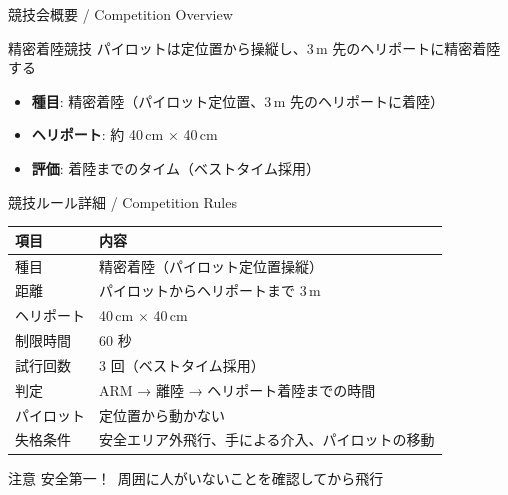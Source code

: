 \documentclass[aspectratio=169, 14pt]{beamer}
\begin{document}
\begin{frame}
  \titlepage
\end{frame}

\begin{frame}{競技会概要 / Competition Overview}
  \begin{block}{精密着陸競技}
    パイロットは定位置から操縦し、3\,m 先のヘリポートに精密着陸する
  \end{block}

  \vspace{1em}

  \begin{itemize}
    \item \textbf{種目}: 精密着陸（パイロット定位置、3\,m 先のヘリポートに着陸）
    \item \textbf{ヘリポート}: 約 40\,cm $\times$ 40\,cm
    \item \textbf{評価}: 着陸までのタイム（ベストタイム採用）
  \end{itemize}
\end{frame}

\begin{frame}{競技ルール詳細 / Competition Rules}
  \centering
  \begin{tabular}{ll}
    \hline
    \textbf{項目} & \textbf{内容} \\
    \hline
    種目      & 精密着陸（パイロット定位置操縦） \\
    距離      & パイロットからヘリポートまで 3\,m \\
    ヘリポート & 40\,cm $\times$ 40\,cm \\
    制限時間  & 60 秒 \\
    試行回数  & 3 回（ベストタイム採用） \\
    判定      & ARM → 離陸 → ヘリポート着陸までの時間 \\
    パイロット & 定位置から動かない \\
    失格条件  & 安全エリア外飛行、手による介入、パイロットの移動 \\
    \hline
  \end{tabular}

  \vspace{1em}

  \begin{alertblock}{注意}
    安全第一！\ 周囲に人がいないことを確認してから飛行
  \end{alertblock}
\end{frame}
\end{document}
